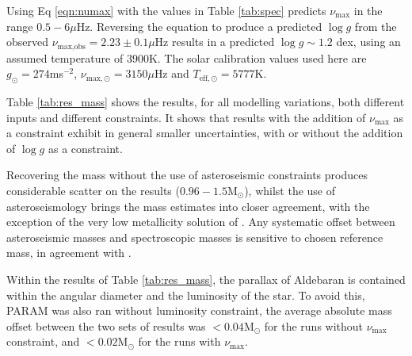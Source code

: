 \documentclass[modern]{aastex61}
\begin{document}
Using Eq \ref{eqn:numax} with the values in Table \ref{tab:spec} predicts $\nu_{\textrm{max}}$ in the range $0.5-6\mu$Hz. Reversing the equation to produce a predicted $\log{g}$ from the observed $\nu_{\textrm{max,obs}}=2.23\pm0.1\mu$Hz results in a predicted $\log{g}\sim1.2$ dex, using an assumed temperature of 3900K. The solar calibration values used here are $g_{\odot}=274$ms$^{-2}$, $\nu_{\textrm{max},\odot}=3150\mu$Hz and $T_{\textrm{eff},\odot}=5777$K. 

Table \ref{tab:res_mass} shows the results, for all modelling variations, both different inputs and different constraints. It shows that results with the addition of $\nu_{\textrm{max}}$ as a constraint exhibit in general smaller uncertainties, with or without the addition of $\log{g}$ as a constraint. 

Recovering the mass without the use of asteroseismic constraints produces considerable scatter on the results ($0.96-1.5\textrm{M}_{\odot}$), whilst the use of asteroseismology brings the mass estimates into closer agreement, with the exception of the very low metallicity solution of \cite{2008Massarotti}. Any systematic offset between asteroseismic masses and spectroscopic masses is sensitive to chosen reference mass, in agreement with \cite{2017North}.

Within the results of Table \ref{tab:res_mass}, the parallax of Aldebaran is contained within the angular diameter and the luminosity of the star. To avoid this, \textsc{PARAM} was also ran without luminosity constraint, the average absolute mass offset between the two sets of results was $<0.04\textrm{M}_{\odot}$ for the runs without $\nu_{\textrm{max}}$ constraint, and $<0.02\textrm{M}_{\odot}$ for the runs with $\nu_{\textrm{max}}$.
\end{document}
